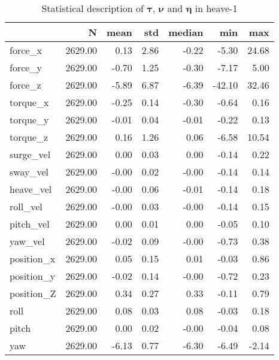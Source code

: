 \begin{table}[hb]
\centering
\caption{Statistical description of $\boldsymbol{\tau}$, $\boldsymbol{\nu}$ and $\boldsymbol{\eta}$ in heave-1}
\label{tab:description-heave-1}
\begin{tabular}{lrrrrrr}
\toprule
{} &       N &  mean &  std & median &    min &   max \\
\midrule
force\_x    & 2629.00 &  0.13 & 2.86 &  -0.22 &  -5.30 & 24.68 \\
force\_y    & 2629.00 & -0.70 & 1.25 &  -0.30 &  -7.17 &  5.00 \\
force\_z    & 2629.00 & -5.89 & 6.87 &  -6.39 & -42.10 & 32.46 \\
torque\_x   & 2629.00 & -0.25 & 0.14 &  -0.30 &  -0.64 &  0.16 \\
torque\_y   & 2629.00 & -0.01 & 0.04 &  -0.01 &  -0.22 &  0.13 \\
torque\_z   & 2629.00 &  0.16 & 1.26 &   0.06 &  -6.58 & 10.54 \\
surge\_vel  & 2629.00 &  0.00 & 0.03 &   0.00 &  -0.14 &  0.22 \\
sway\_vel   & 2629.00 & -0.00 & 0.02 &  -0.00 &  -0.14 &  0.14 \\
heave\_vel  & 2629.00 & -0.00 & 0.06 &  -0.01 &  -0.14 &  0.18 \\
roll\_vel   & 2629.00 & -0.00 & 0.03 &  -0.00 &  -0.14 &  0.15 \\
pitch\_vel  & 2629.00 &  0.00 & 0.01 &   0.00 &  -0.05 &  0.10 \\
yaw\_vel    & 2629.00 & -0.02 & 0.09 &  -0.00 &  -0.73 &  0.38 \\
position\_x & 2629.00 &  0.05 & 0.15 &   0.01 &  -0.03 &  0.86 \\
position\_y & 2629.00 & -0.02 & 0.14 &  -0.00 &  -0.72 &  0.23 \\
position\_Z & 2629.00 &  0.34 & 0.27 &   0.33 &  -0.11 &  0.79 \\
roll       & 2629.00 &  0.08 & 0.03 &   0.08 &  -0.03 &  0.18 \\
pitch      & 2629.00 &  0.00 & 0.02 &  -0.00 &  -0.04 &  0.08 \\
yaw        & 2629.00 & -6.13 & 0.77 &  -6.30 &  -6.49 & -2.14 \\
\bottomrule
\end{tabular}
\end{table}
